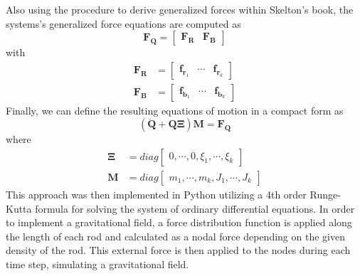 Also using the procedure to derive generalized forces within Skelton's book, the systems's generalized force equations are computed as
\begin{equation}
\mathbf{F}_{\mathbf{Q}} = \begin{bmatrix}
	\mathbf{F}_{\mathbf{R}} & \mathbf{F}_{\mathbf{B}}
	\end{bmatrix}\label{eq:generalizedForce}
\end{equation}
with
\begin{align}
\mathbf{F}_{\mathbf{R}} &= \begin{bmatrix}
	\mathbf{f}_{\mathbf{r}_{1}} & \cdots & \mathbf{f}_{\mathbf{r}_{k}}
	\end{bmatrix}\label{eq:gForceR}\\
\mathbf{F}_{\mathbf{B}} &= \begin{bmatrix}
	\mathbf{f}_{\mathbf{b}_{1}} & \cdots & \mathbf{f}_{\mathbf{b}_{k}}
	\end{bmatrix}\label{eq:gForceB}
\end{align}
Finally, we can define the resulting equations of motion in a compact form as
\begin{equation}
(\ddot{\mathbf{Q}} + \mathbf{Q}\mathbf{\Xi})\mathbf{M} = \mathbf{F}_{\mathbf{Q}}\label{eq:compactForm}
\end{equation}
where
\begin{align}
\mathbf{\Xi} &= diag\begin{bmatrix}
	0,\cdots,0,\xi_{1},\cdots,\xi_{k}
	\end{bmatrix}\label{eq:lagrangeMatrix}\\
\mathbf{M} &= diag\begin{bmatrix}
	m_{1},\cdots,m_{k},J_{1},\cdots,J_{k}
	\end{bmatrix}\label{massMatrix}
\end{align}
This approach was then implemented in Python utilizing a 4th order Runge-Kutta formula for solving the system of ordinary differential equations.  
In order to implement a gravitational field, a force distribution function is applied along the length of each rod and calculated as a nodal force depending on the given density of the rod.
This external force is then applied to the nodes during each time step, simulating a gravitational field.

